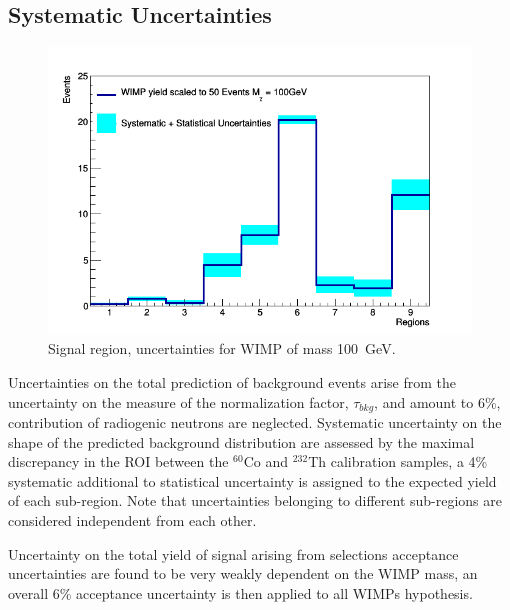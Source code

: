 \subsection{Systematic Uncertainties}

\begin{figure}[t!]
  \includegraphics[width=\linewidth]{images/wimp_sys_unc.png}
  \caption{Signal region, uncertainties for WIMP of mass 100~GeV.}
  \label{fig:unc}
\end{figure}


Uncertainties on the total prediction of background events arise from the uncertainty on the measure of the normalization 
factor, $\tau_{bkg}$, and amount to 6\%, contribution of radiogenic neutrons are neglected. 
Systematic uncertainty on the shape of the predicted background distribution are assessed by the maximal discrepancy in the ROI between
the $^{60}$Co and $^{232}$Th calibration samples, a 4\% systematic additional to statistical uncertainty is assigned to the expected yield of each sub-region.
Note that uncertainties belonging to different sub-regions are considered independent from each other.

Uncertainty on the total yield of signal arising from selections acceptance uncertainties are found to be very weakly dependent on 
the WIMP mass, an overall 6\% acceptance uncertainty is then applied to all WIMPs hypothesis. 

